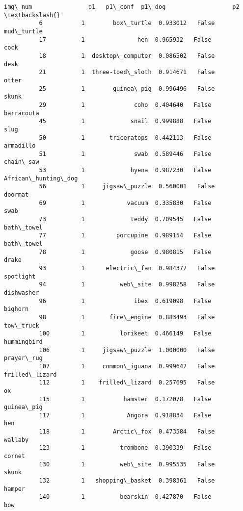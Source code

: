 \documentclass[11pt]{article}
\begin{document}
\begin{Verbatim}[commandchars=\\\{\}]
                img\_num                p1   p1\_conf  p1\_dog                   p2  \textbackslash{}
          6           1        box\_turtle  0.933012   False           mud\_turtle   
          17          1               hen  0.965932   False                 cock   
          18          1  desktop\_computer  0.086502   False                 desk   
          21          1  three-toed\_sloth  0.914671   False                otter   
          25          1        guinea\_pig  0.996496   False                skunk   
          29          1              coho  0.404640   False           barracouta   
          45          1             snail  0.999888   False                 slug   
          50          1       triceratops  0.442113   False            armadillo   
          51          1              swab  0.589446   False            chain\_saw   
          53          1             hyena  0.987230   False  African\_hunting\_dog   
          56          1     jigsaw\_puzzle  0.560001   False              doormat   
          69          1            vacuum  0.335830   False                 swab   
          73          1             teddy  0.709545   False           bath\_towel   
          77          1         porcupine  0.989154   False           bath\_towel   
          78          1             goose  0.980815   False                drake   
          93          1      electric\_fan  0.984377   False            spotlight   
          94          1          web\_site  0.998258   False           dishwasher   
          96          1              ibex  0.619098   False              bighorn   
          98          1       fire\_engine  0.883493   False            tow\_truck   
          100         1          lorikeet  0.466149   False          hummingbird   
          106         1     jigsaw\_puzzle  1.000000   False           prayer\_rug   
          107         1     common\_iguana  0.999647   False       frilled\_lizard   
          112         1    frilled\_lizard  0.257695   False                   ox   
          115         1           hamster  0.172078   False           guinea\_pig   
          117         1            Angora  0.918834   False                  hen   
          118         1        Arctic\_fox  0.473584   False              wallaby   
          123         1          trombone  0.390339   False               cornet   
          130         1          web\_site  0.995535   False                skunk   
          132         1   shopping\_basket  0.398361   False               hamper   
          140         1          bearskin  0.427870   False                  bow   

\end{Verbatim}
\end{document}
